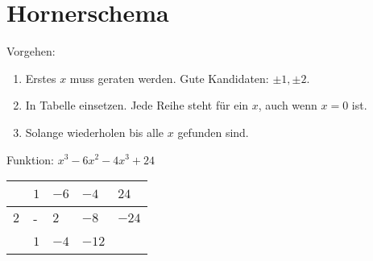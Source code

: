 \section{Hornerschema}
Vorgehen:
\begin{enumerate}
	\item Erstes \(x\) muss geraten werden. Gute Kandidaten: \(\pm 1, \pm 2\). 
	\item In Tabelle einsetzen. Jede Reihe steht für ein \(x\), auch wenn \(x=0\) ist.
	\item Solange wiederholen bis alle \(x\) gefunden sind.
\end{enumerate}
Funktion: \( x^3-6x^2-4x^3+24\) \newline
\newline
\begin{tabular}{l|l|l|l|l}
	~ & \(1\) & \(-6\) & \(-4\) & \(24\) \\ \hline
	\(2\)& - & \(2\) & \(-8\) & \(-24\) \\ \hline
	~ & \(1\) & \(-4\) & \(-12\) & ~ \\ 
\end{tabular}
